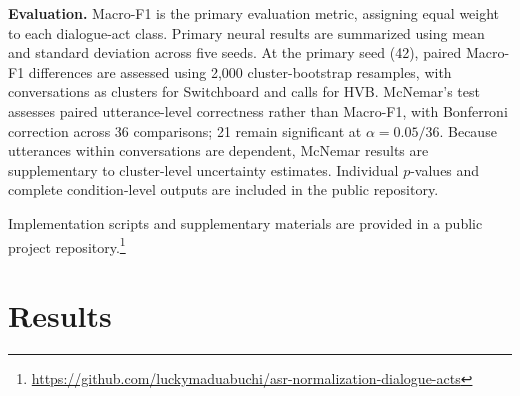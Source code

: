 \documentclass[conference]{IEEEtran}
\begin{document}
\textbf{Evaluation.}
Macro-F1 is the primary evaluation metric,
assigning equal weight to each dialogue-act class.
Primary neural results are summarized using
mean and standard deviation across five seeds.
At the primary seed (42), paired Macro-F1
differences are assessed using 2,000
cluster-bootstrap resamples, with conversations
as clusters for Switchboard and calls for HVB.
McNemar's test assesses paired utterance-level
correctness rather than Macro-F1, with
Bonferroni correction across 36 comparisons; 21
remain significant at $\alpha=0.05/36$.
Because utterances within conversations are
dependent, McNemar results are supplementary
to cluster-level uncertainty estimates. Individual
$p$-values and complete condition-level outputs
are included in the public repository.

Implementation scripts and supplementary
materials are provided in a public project
repository.\footnote{
\url{https://github.com/luckymaduabuchi/asr-normalization-dialogue-acts}}




\section{Results}
\label{sec:results}
\end{document}
